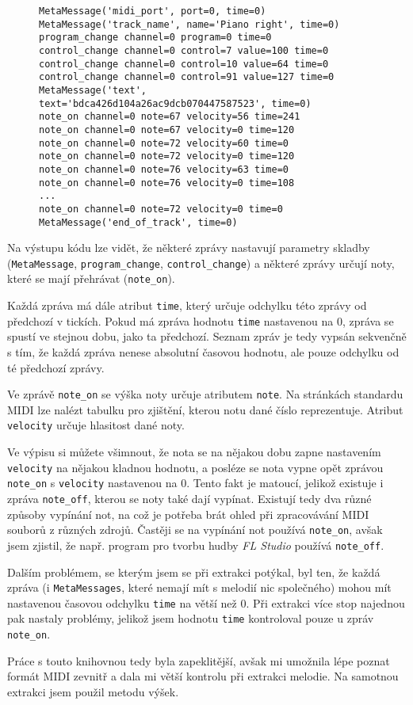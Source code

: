 \begin{figure}[!ht]
    \begin{verbatim}
MetaMessage('midi_port', port=0, time=0)
MetaMessage('track_name', name='Piano right', time=0)
program_change channel=0 program=0 time=0
control_change channel=0 control=7 value=100 time=0
control_change channel=0 control=10 value=64 time=0
control_change channel=0 control=91 value=127 time=0
MetaMessage('text', text='bdca426d104a26ac9dcb070447587523', time=0)
note_on channel=0 note=67 velocity=56 time=241
note_on channel=0 note=67 velocity=0 time=120
note_on channel=0 note=72 velocity=60 time=0
note_on channel=0 note=72 velocity=0 time=120
note_on channel=0 note=76 velocity=63 time=0
note_on channel=0 note=76 velocity=0 time=108
...
note_on channel=0 note=72 velocity=0 time=0
MetaMessage('end_of_track', time=0)
    \end{verbatim}
\end{figure}

Na výstupu kódu lze vidět, že některé zprávy nastavují parametry skladby (\lstinline{MetaMessage}, \lstinline{program_change}, \lstinline{control_change}) a některé zprávy určují noty, které se mají přehrávat (\lstinline{note_on}).

Každá zpráva má dále atribut \lstinline{time}, který určuje odchylku této zprávy od předchozí v tickích. Pokud má zpráva hodnotu \lstinline{time} nastavenou na 0, zpráva se spustí ve stejnou dobu, jako ta předchozí. Seznam zpráv je tedy vypsán sekvenčně s tím, že každá zpráva nenese absolutní časovou hodnotu, ale pouze odchylku od té předchozí zprávy.

Ve zprávě \lstinline{note_on} se výška noty určuje atributem \lstinline{note}. Na stránkách standardu MIDI \cite{midi-standard} lze nalézt tabulku pro zjištění, kterou notu dané číslo reprezentuje. Atribut \lstinline{velocity} určuje hlasitost dané noty.

Ve výpisu si můžete všimnout, že nota se na nějakou dobu zapne nastavením \lstinline{velocity} na nějakou kladnou hodnotu, a posléze se nota vypne opět zprávou \lstinline{note_on} s \lstinline{velocity} nastavenou na 0. Tento fakt je matoucí, jelikož existuje i zpráva \lstinline{note_off}, kterou se noty také dají vypínat. Existují tedy dva různé způsoby vypínání not, na což je potřeba brát ohled při zpracovávání MIDI souborů z různých zdrojů. Častěji se na vypínání not používá \lstinline{note_on}, avšak jsem zjistil, že např. program pro tvorbu hudby \textit{FL Studio} používá \lstinline{note_off}.

Dalším problémem, se kterým jsem se při extrakci potýkal, byl ten, že každá zpráva (i \lstinline{MetaMessages}, které nemají mít s melodií nic společného) mohou mít nastavenou časovou odchylku \lstinline{time} na větší než 0. Při extrakci více stop najednou pak nastaly problémy, jelikož jsem hodnotu \lstinline{time} kontroloval pouze u zpráv \lstinline{note_on}.

Práce s touto knihovnou tedy byla zapeklitější, avšak mi umožnila lépe poznat formát MIDI zevnitř a dala mi větší kontrolu při extrakci melodie. Na samotnou extrakci jsem použil metodu výšek.

